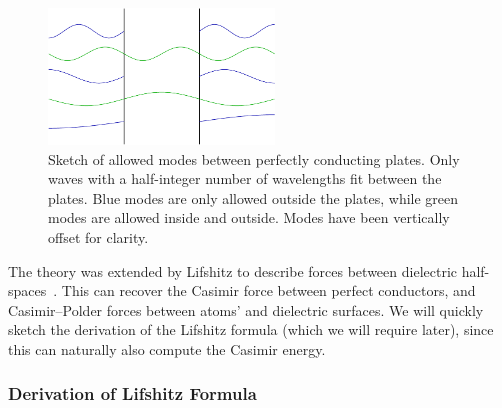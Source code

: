 \begin{figure}
\center
\includegraphics[width=6cm]{fig/intro/twoplanes_wave}
\caption[Allowed modes between parallel plates]
{Sketch of allowed modes between perfectly conducting plates. 
 Only waves with a half-integer number of wavelengths fit between the plates.
Blue modes are only allowed outside the plates, while green modes are allowed inside
and outside.  Modes have been vertically offset for clarity.  }
\label{fig:Casimir_sketch}
\end{figure}

The theory was extended by Lifshitz to describe forces between dielectric half-spaces~\cite{Lifshitz1956,
Dzyaloshinskii1959,Dzyaloshinskii1961}.  This can recover the Casimir force between 
perfect conductors, and Casimir--Polder forces between atoms' and dielectric surfaces.  
We will quickly sketch the derivation of the Lifshitz formula (which we will require later),
since this can naturally also compute the Casimir energy.



\subsubsection{Derivation of Lifshitz Formula}

